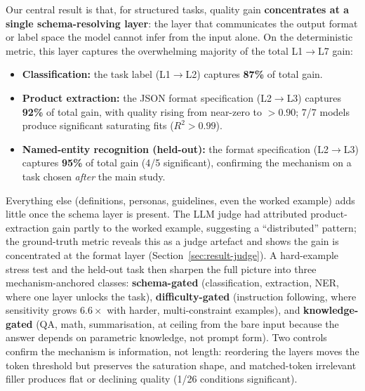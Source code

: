 Our central result is that, for structured tasks, quality gain
\textbf{concentrates at a single schema-resolving layer}: the layer that
communicates the output format or label space the model cannot infer from the
input alone.
On the deterministic metric, this layer captures the overwhelming majority of
the total L1$\to$L7 gain:
\begin{itemize}
  \item \textbf{Classification:} the task label (L1$\to$L2) captures
    \textbf{87\%} of total gain.
  \item \textbf{Product extraction:} the JSON format specification
    (L2$\to$L3) captures \textbf{92\%} of total gain, with quality rising from
    near-zero to ${>}0.90$; 7/7 models produce significant saturating fits
    ($R^2 > 0.99$).
  \item \textbf{Named-entity recognition (held-out):} the format specification
    (L2$\to$L3) captures \textbf{95\%} of total gain (4/5 significant),
    confirming the mechanism on a task chosen \emph{after} the main study.
\end{itemize}
Everything else (definitions, personas, guidelines, even the worked example)
adds little once the schema layer is present.
The LLM judge had attributed product-extraction gain partly to the worked
example, suggesting a ``distributed'' pattern; the ground-truth metric reveals
this as a judge artefact and shows the gain is concentrated at the format
layer (Section~\ref{sec:result-judge}).
A hard-example stress test and the held-out task then sharpen the full picture
into three mechanism-anchored classes:
\textbf{schema-gated} (classification, extraction, NER, where one layer unlocks
the task), \textbf{difficulty-gated} (instruction following, where sensitivity
grows $6.6\times$ with harder, multi-constraint examples), and
\textbf{knowledge-gated} (QA, math, summarisation, at ceiling from the bare
input because the answer depends on parametric knowledge, not prompt form).
Two controls confirm the mechanism is information, not length: reordering the
layers moves the token threshold but preserves the saturation shape, and
matched-token irrelevant filler produces flat or declining quality (1/26
conditions significant).

